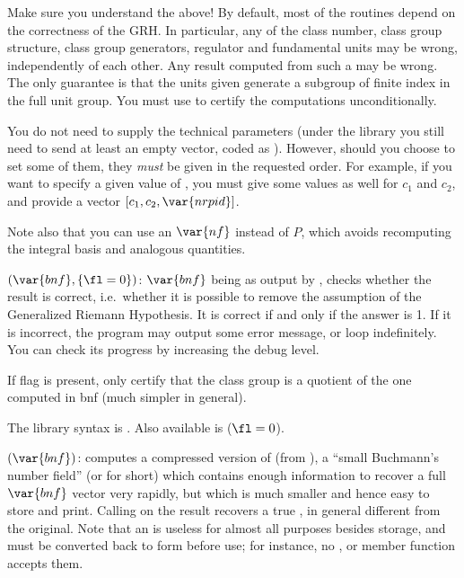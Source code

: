  Make sure you understand the above! By default, most of
the  routines depend on the correctness of the GRH. In particular,
any of the class number, class group structure, class group generators,
regulator and fundamental units may be wrong, independently of each other.
Any result computed from such a  may be wrong. The only guarantee is
that the units given generate a subgroup of finite index in the full unit
group. You must use  to certify the computations
unconditionally.


You do not need to supply the technical parameters (under the library you
still need to send at least an empty vector, coded as ). However,
should you choose to set some of them, they \emph{must} be given in the
requested order. For example, if you want to specify a given value of
, you must give some values as well for $c_1$ and $c_2$, and provide
a vector $[c_1,c_2,\var{nrpid}]$.

Note also that you can use an $\var{nf}$ instead of $P$, which avoids
recomputing the integral basis and analogous quantities.

\smallskip


$(\var{bnf},\{\fl = 0\})$: \label{se:bnfcertify}$\var{bnf}$ being as output by
, checks whether the result is correct, i.e.~whether it is
possible to remove the assumption of the Generalized Riemann
Hypothesis. It is correct if and only if the answer is 1. If it is
incorrect, the program may output some error message, or loop indefinitely.
You can check its progress by increasing the debug level.

If flag is present, only certify that the class group is a quotient of the
one computed in bnf (much simpler in general).

The library syntax is .
Also available is   ($\fl=0$).

$(\var{bnf})$: \label{se:bnfcompress}computes a compressed version of  (from ), a
``small Buchmann's number field'' (or  for short) which contains
enough information to recover a full $\var{bnf}$ vector very rapidly, but
which is much smaller and hence easy to store and print. Calling
 on the result recovers a true , in general different
from the original. Note that an  is useless for almost all
purposes besides storage, and must be converted back to  form
before use; for instance, no ,  or member function
accepts them.

